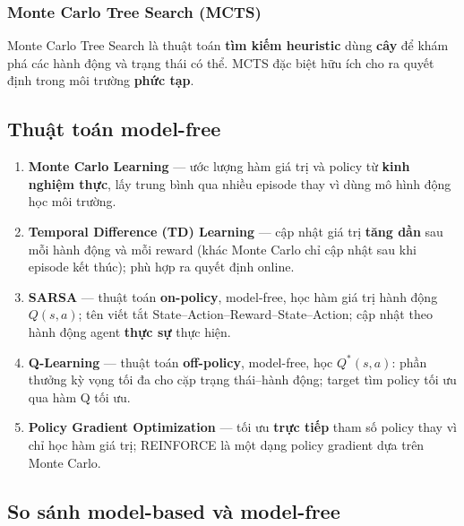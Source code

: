 \subsubsection{Monte Carlo Tree Search (MCTS)}

\begin{dinhnghia}[title={MCTS}]
Monte Carlo Tree Search là thuật toán \textbf{tìm kiếm heuristic} dùng \textbf{cây} để khám phá các hành động và trạng thái có thể.
MCTS đặc biệt hữu ích cho ra quyết định trong môi trường \textbf{phức tạp}.
\end{dinhnghia}

\subsection{Thuật toán model-free}

\begin{phuongphap}[title={Danh sách thuật toán model-free chính}]
\begin{enumerate}
  \item \textbf{Monte Carlo Learning} --- ước lượng hàm giá trị và policy từ \textbf{kinh nghiệm thực}, lấy trung bình qua nhiều episode thay vì dùng mô hình động học môi trường.
  \item \textbf{Temporal Difference (TD) Learning} --- cập nhật giá trị \textbf{tăng dần} sau mỗi hành động và mỗi reward (khác Monte Carlo chỉ cập nhật sau khi episode kết thúc); phù hợp ra quyết định online.
  \item \textbf{SARSA} --- thuật toán \textbf{on-policy}, model-free, học hàm giá trị hành động $Q(s,a)$; tên viết tắt State--Action--Reward--State--Action; cập nhật theo hành động agent \textbf{thực sự} thực hiện.
  \item \textbf{Q-Learning} --- thuật toán \textbf{off-policy}, model-free, học $Q^*(s,a)$: phần thưởng kỳ vọng tối đa cho cặp trạng thái--hành động; target tìm policy tối ưu qua hàm Q tối ưu.
  \item \textbf{Policy Gradient Optimization} --- tối ưu \textbf{trực tiếp} tham số policy thay vì chỉ học hàm giá trị; REINFORCE là một dạng policy gradient dựa trên Monte Carlo.
\end{enumerate}
\end{phuongphap}

\subsection{So sánh model-based và model-free}


